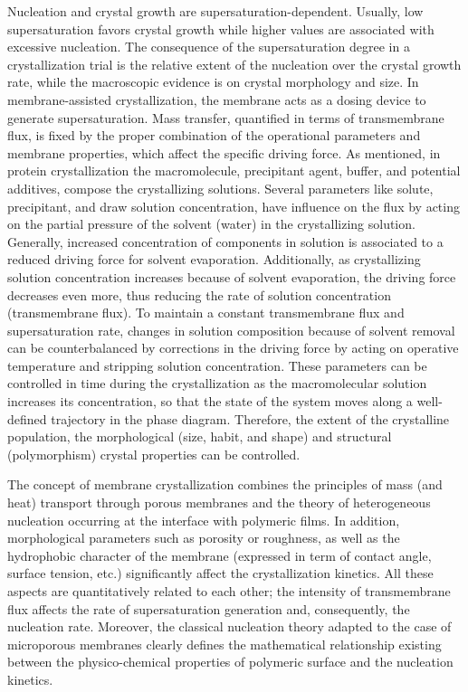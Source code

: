\documentclass[11ptm,oneside,a4paper]{report}
\begin{document}
Nucleation and crystal growth are supersaturation-dependent. Usually, low supersaturation favors crystal growth while higher values are associated with excessive nucleation. The consequence of the supersaturation degree in a crystallization trial is the relative extent of the nucleation over the crystal growth rate, while the macroscopic evidence is on crystal morphology and size.  
In membrane-assisted crystallization, the membrane acts as a dosing device to generate supersaturation. Mass transfer, quantified in terms of transmembrane flux, is fixed by the proper combination of the operational parameters and membrane properties, which affect the specific driving force. As mentioned, in protein crystallization the macromolecule, precipitant agent, buffer, and potential additives, compose the crystallizing solutions. Several parameters like solute, precipitant, and draw solution concentration, have influence on the flux by acting on the partial pressure of the solvent (water) in the crystallizing solution. Generally, increased concentration of components in solution is associated to a reduced driving force for solvent evaporation. Additionally, as crystallizing solution concentration increases because of solvent evaporation, the driving force decreases even more, thus reducing the rate of solution concentration (transmembrane flux). To maintain a constant transmembrane flux and supersaturation rate, changes in solution composition because of solvent removal can be counterbalanced by corrections in the driving force by acting on operative temperature and stripping solution concentration. These parameters can be controlled in time during the crystallization as the macromolecular solution increases its concentration, so that the state of the system moves along a well-defined trajectory in the phase diagram. Therefore, the extent of the crystalline population, the morphological (size, habit, and shape) and structural (polymorphism) crystal properties can be controlled. 
  
The concept of membrane crystallization combines the principles of mass (and heat) transport through porous membranes and the theory of heterogeneous nucleation occurring at the interface with polymeric films. In addition, morphological parameters such as porosity or roughness, as well as the hydrophobic character of the membrane (expressed in term of contact angle, surface tension, etc.) significantly affect the crystallization kinetics. All these aspects are quantitatively related to each other; the intensity of transmembrane flux affects the rate of supersaturation generation and, consequently, the nucleation rate. Moreover, the classical nucleation theory adapted to the case of microporous membranes clearly defines the mathematical relationship existing between the physico-chemical properties of polymeric surface and the nucleation kinetics. 
 
\end{document}

